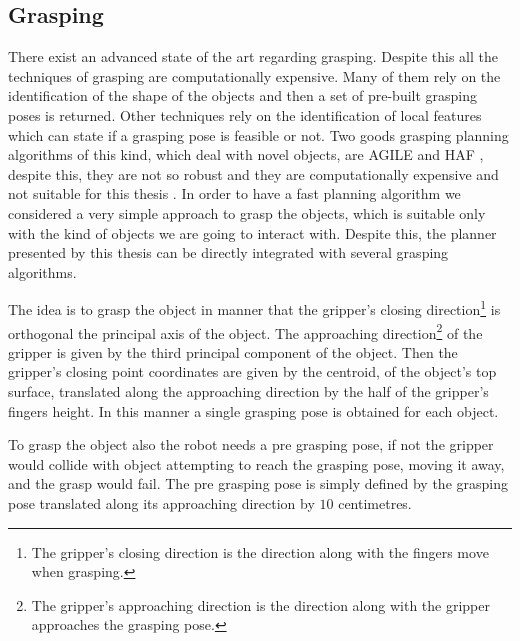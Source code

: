 
\subsection{Grasping}
\label{sec:grasping}

There exist an advanced state of the art regarding grasping. Despite this all the techniques of grasping are  computationally expensive. Many of them rely on the identification of the shape of the objects and then a set of pre-built grasping poses is returned\citep{brook2011collaborative}. Other techniques rely on the identification of local features which can state if a grasping pose is feasible or not. Two goods grasping planning algorithms of this kind, which deal with novel objects, are AGILE \citep{AGILE} and HAF \citep{haf}, despite this, they are not so robust and they are computationally expensive and not suitable for this thesis \citep{covallero}. In order to have a fast planning algorithm we considered a very simple approach to grasp the objects, which is suitable only with the kind of objects we are going to interact with. Despite this, the planner presented by this thesis can be directly integrated with several grasping algorithms. 

The idea is to grasp the object in manner that the gripper's closing direction\footnote{The gripper's closing direction is the direction along with the fingers move when grasping.} is orthogonal the principal axis of the object. The approaching direction\footnote{The gripper's approaching direction is the direction along with the gripper approaches the grasping pose.} of the gripper is given by the third principal component of the object. Then the gripper's closing point coordinates are given by the centroid, of the object's top surface, translated along the approaching direction by the half of the gripper's fingers height.
In this manner a single grasping pose is obtained for each object. 

To grasp the object also the robot needs a pre grasping pose, if not the gripper would collide with object attempting to reach the grasping pose, moving it away, and the grasp would fail. The pre grasping pose is simply defined by the grasping pose translated along its approaching direction by $10$ centimetres.

